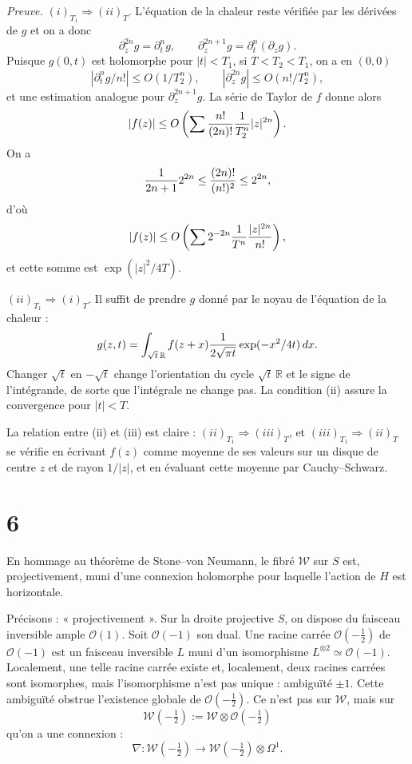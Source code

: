 \documentclass[11pt]{article}
\newcommand{\R}{\mathbb R}
\newcommand{\cO}{\mathcal O}
\newcommand{\cW}{\mathcal W}
\newcommand{\dd}{\,d}
\newcommand{\half}{\tfrac12}
\begin{document}
\emph{Preuve.} $(i)_{T_1}\Rightarrow(ii)_T$. L'équation de la chaleur reste vérifiée par les dérivées de $g$ et on a donc
\[
\partial_z^{2n}g=\partial_t^n g,
\qquad
\partial_z^{2n+1}g=\partial_t^n(\partial_z g).
\]
Puisque $g(0,t)$ est holomorphe pour $|t|<T_1$, si $T<T_2<T_1$, on a en $(0,0)$
\[
|\partial_t^n g/n!|\le O(1/T_2^n),
\qquad
|\partial_z^{2n}g|\le O(n!/T_2^n),
\]
et une estimation analogue pour $\partial_z^{2n+1}g$. La série de Taylor de $f$ donne alors
\[
|f(z)|\le O\left(\sum {n!\over(2n)!}{1\over T_2^n}|z|^{2n}\right).
\]
On a
\[
{1\over2n+1}2^{2n}\le{(2n)!\over(n!)^2}\le2^{2n},
\]
d'où
\[
|f(z)|\le O\left(\sum 2^{-2n}{1\over T^n}{|z|^{2n}\over n!}\right),
\]
et cette somme est $\exp(|z|^2/4T)$.

$(ii)_{T_1}\Rightarrow(i)_T$. Il suffit de prendre $g$ donné par le noyau de l'équation de la chaleur :
\[
g(z,t)=\int_{\sqrt t\,\R} f(z+x){1\over2\sqrt{\pi t}}\exp(-x^2/4t)\dd x.
\]
Changer $\sqrt t$ en $-\sqrt t$ change l'orientation du cycle $\sqrt t\,\R$ et le signe de l'intégrande, de sorte que l'intégrale ne change pas. La condition (ii) assure la convergence pour $|t|<T$.

La relation entre (ii) et (iii) est claire : $(ii)_{T_1}\Rightarrow(iii)_T$, et $(iii)_{T_1}\Rightarrow(ii)_T$ se vérifie en écrivant $f(z)$ comme moyenne de ses valeurs sur un disque de centre $z$ et de rayon $1/|z|$, et en évaluant cette moyenne par Cauchy--Schwarz.

\section*{6}
En hommage au théorème de Stone--von Neumann, le fibré $\cW$ sur $S$ est, projectivement, muni d'une connexion holomorphe pour laquelle l'action de $H$ est horizontale.

Précisons : « projectivement ». Sur la droite projective $S$, on dispose du faisceau inversible ample $\cO(1)$. Soit $\cO(-1)$ son dual. Une racine carrée $\cO(-\half)$ de $\cO(-1)$ est un faisceau inversible $L$ muni d'un isomorphisme $L^{\otimes2}\simeq\cO(-1)$. Localement, une telle racine carrée existe et, localement, deux racines carrées sont isomorphes, mais l'isomorphisme n'est pas unique : ambiguïté $\pm1$. Cette ambiguïté obstrue l'existence globale de $\cO(-\half)$. Ce n'est pas sur $\cW$, mais sur
\[
\cW(-\half):=\cW\otimes\cO(-\half)
\]
qu'on a une connexion :
\begin{equation}\tag{6.1}
\nabla:\cW(-\half)\longrightarrow\cW(-\half)\otimes\Omega^1.
\end{equation}
\end{document}
